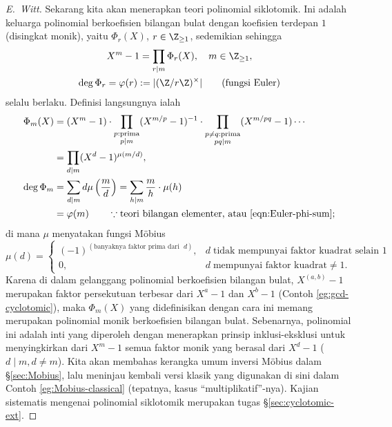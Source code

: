 \begin{proof}[E.\ Witt]
	Sekarang kita akan menerapkan teori polinomial siklotomik. Ini adalah keluarga polinomial berkoefisien bilangan bulat dengan koefisien terdepan $1$ (disingkat monik), yaitu $\Phi_r(X)$, $r \in \Z_{\geq 1}$, sedemikian sehingga
	\begin{gather*}
		X^m - 1 = \prod_{r \mid m} \Phi_r(X), \quad m \in \Z_{\geq 1}, \\
		\deg \Phi_r = \varphi(r) := |(\Z/r\Z)^\times| \qquad \text{(fungsi Euler)}
	\end{gather*}
	selalu berlaku. Definisi langsungnya ialah
	\begin{align*}
		\Phi_m(X) & = (X^m - 1) \cdot \prod_{\substack{p: \text{prima} \\ p \mid m}} (X^{m/p} - 1)^{-1} \cdot \prod_{\substack{p \neq q: \text{prima} \\ pq \mid m}} (X^{m/pq} - 1) \cdots \\
		& = \prod_{d \mid m} (X^d - 1)^{\mu(m/d)}, \\
		\deg \Phi_m & = \sum_{d \mid m} d \mu\left( \frac{m}{d} \right) = \sum_{h \mid m} \frac{m}{h} \cdot \mu(h) \\
		& = \varphi(m) \qquad \because \text{teori bilangan elementer, atau \eqref{eqn:Euler-phi-sum}};
	\end{align*}
	di mana $\mu$ menyatakan fungsi Möbius
	\[ \mu(d) = \begin{cases}
		(-1)^{(\text{banyaknya faktor prima dari }\; d)}, & d \;\text{tidak mempunyai faktor kuadrat selain $1$} \\
		0, & d \; \text{mempunyai faktor kuadrat} \neq 1.
	\end{cases}\]
	Karena di dalam gelanggang polinomial berkoefisien bilangan bulat, $X^{(a,b)}-1$ merupakan faktor persekutuan terbesar dari $X^a - 1$ dan $X^b - 1$ (Contoh \ref{eg:gcd-cyclotomic}), maka $\Phi_m(X)$ yang didefinisikan dengan cara ini memang merupakan polinomial monik berkoefisien bilangan bulat. Sebenarnya, polinomial ini adalah inti yang diperoleh dengan menerapkan prinsip inklusi-eksklusi untuk menyingkirkan dari $X^m - 1$ semua faktor monik yang berasal dari $X^d - 1$ ($d \mid m, d \neq m$). Kita akan membahas kerangka umum inversi Möbius dalam \S\ref{sec:Mobius}, lalu meninjau kembali versi klasik yang digunakan di sini dalam Contoh \ref{eg:Mobius-classical} (tepatnya, kasus ``multiplikatif''-nya). Kajian sistematis mengenai polinomial siklotomik merupakan tugas \S\ref{sec:cyclotomic-ext}.


\end{proof}
